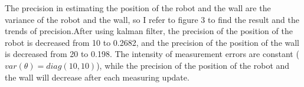 \documentclass{article}
\begin{document}
\noindent The precision in estimating the position of the robot and the wall are the variance of the robot and the wall, so I refer to figure 3 to find 
the result and the trends of precision.After using kalman filter, the precision of the position of the robot is decreased from 10 to 0.2682, and 
the precision of the position of the wall is decreased from 20 to 0.198. The intensity of measurement  errors are constant ($var(\theta)=diag(10,10)$), 
while the precision of the position of the robot and the wall will decrease after each measuring update. 
 
\end{document}
